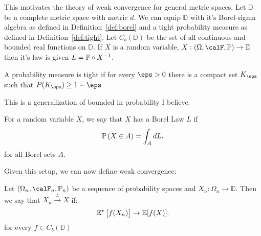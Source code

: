 This motivates the theory of weak convergence for general metric spaces. Let \(\mathbb{D}\) be a complete metric space with metric  \(d\). We can equip \(\mathbb{D}\) with it's Borel-sigma algebra as defined in Definition~\ref{def:borel} and a tight probability measure as defined in Definition~\ref{def:tight}. Let  \(C_b\left(\mathbb{D}\right)\) be the set of all continuous and bounded real functions on \(\mathbb{D}\). If \(X\) is a random variable,  \(X:(\Omega,\calF,\P) \to \mathbb{D}\) then it's law is given \(L = \P\circ X^{-1}\).


\begin{definition}
	\label{def:tight}
	A probability measure is tight if for every \(\eps > 0\) there is a compact set  \(K_\eps\) such that  \(P(K_\eps) \geq  1-\eps\)
\end{definition}
This is a generalization of bounded in probability I believe. 
\begin{definition}
	\label{def:borel-law}
	For a random variable \(X\), we say that  \(X\) has a Borel Law  \(L\) if
	 \[
		 \P\left(X\in A\right) = \int_A dL
	.\] 
	for all Borel sets \(A\). 
\end{definition}
Given this setup, we can now define weak convergence:
\begin{definition}
	\label{def:wcov}
	Let \((\Omega_n, \calF_n,\P_n)\) be a sequence of probability spaces and  \(X_n:\Omega_n \to \mathbb{D}\). Then we say that \(X_n\overset{L}{\to}X\) if:
	 \[
		 \E^\star\left[f(X_n)\right]\to \E[f(X)]
	.\] 
	for every \(f \in C_b(\mathbb{D})\)
\end{definition}

